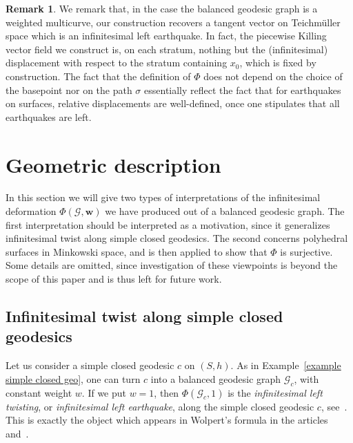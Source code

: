 \documentclass[11pt]{article}
\theoremstyle{definition}
\newtheorem{rema}[theo]{Remark}
\numberwithin{equation}{section}
\numberwithin{figure}{section}
\numberwithin{table}{section}
\begin{document}
\begin{rema}
We remark that, in the case the balanced geodesic graph is a weighted multicurve, our construction recovers a tangent vector on Teichm\"uller space which is an infinitesimal left earthquake. In fact, the piecewise Killing vector field we construct is, on each stratum, nothing but the (infinitesimal) displacement with respect to the stratum containing $x_0$, which is fixed by construction. The fact that the definition of $\Phi$ does not depend on the choice of the basepoint nor on the path $\sigma$ essentially reflect the fact that for earthquakes on surfaces, relative displacements are well-defined, once one stipulates that all earthquakes are left.
\end{rema}

\section{Geometric description}

In this section we will give two types of interpretations of the infinitesimal deformation $\Phi(\mathcal{G},\mathbf w)$ we have produced out of a balanced geodesic graph. The first interpretation should be interpreted as a motivation, since it generalizes infinitesimal twist along simple closed geodesics. The second concerns polyhedral surfaces in Minkowski space, and is then applied to show that $\Phi$ is surjective. Some details are omitted, since investigation of these viewpoints is beyond the scope of this paper and is thus left for future work.

\subsection{Infinitesimal twist along simple closed geodesics}
Let us consider a simple closed geodesic $c$ on $(S,h)$. As in Example~\ref{example simple closed geo}, one can turn $c$ into a balanced geodesic graph $\mathcal{G}_c$, with constant weight $w$. If we put $w=1$, then $\Phi(\mathcal{G}_c,1)$ is the \emph{infinitesimal left twisting}, or \emph{infinitesimal left earthquake}, along the simple closed geodesic $c$, see~\cite[Proposition~B.3]{bonschlfixed}. This is exactly the object which appears in Wolpert's formula in the articles~\cite{wolpertformula} and~\cite{wolpertelementary}.
\end{document}
